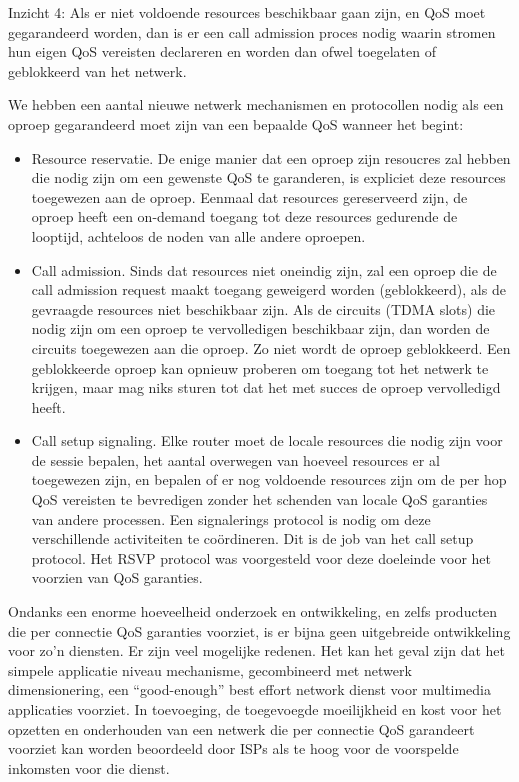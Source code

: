 \noindent Inzicht 4: Als er niet voldoende resources beschikbaar gaan zijn, en QoS moet gegarandeerd worden, dan is er een call admission proces nodig waarin stromen hun eigen QoS vereisten declareren en worden dan ofwel toegelaten of geblokkeerd van het netwerk.

\noindent We hebben een aantal nieuwe netwerk mechanismen en protocollen nodig als een oproep gegarandeerd moet zijn van een bepaalde QoS wanneer het begint:

\begin{itemize}
\item Resource reservatie. De enige manier dat een oproep zijn resoucres zal hebben die nodig zijn om een gewenste QoS te garanderen, is expliciet deze resources toegewezen aan de oproep. Eenmaal dat resources gereserveerd zijn, de oproep heeft een on-demand toegang tot deze resources gedurende de looptijd, achteloos de noden van alle andere oproepen.
\item Call admission. Sinds dat resources niet oneindig zijn, zal een oproep die de call admission request maakt toegang geweigerd worden (geblokkeerd), als de gevraagde resources niet beschikbaar zijn. Als de circuits (TDMA slots) die nodig zijn om een oproep te vervolledigen beschikbaar zijn, dan worden de circuits toegewezen aan die oproep. Zo niet wordt de oproep geblokkeerd. Een geblokkeerde oproep kan opnieuw proberen om toegang tot het netwerk te krijgen, maar mag niks sturen tot dat het met succes de oproep vervolledigd heeft.
\item Call setup signaling. Elke router moet de locale resources die nodig zijn voor de sessie bepalen, het aantal overwegen van hoeveel resources er al toegewezen zijn, en bepalen of er nog voldoende resources zijn om de per hop QoS vereisten te bevredigen zonder het schenden van locale QoS garanties van andere processen. Een signalerings protocol is nodig om deze verschillende activiteiten te coördineren. Dit is de job van het call setup protocol. Het RSVP protocol was voorgesteld voor deze doeleinde voor het voorzien van QoS garanties.
\end{itemize}

\noindent Ondanks een enorme hoeveelheid onderzoek en ontwikkeling, en zelfs producten die per connectie QoS garanties voorziet, is er bijna geen uitgebreide ontwikkeling voor zo’n diensten. Er zijn veel mogelijke redenen. Het kan het geval zijn dat het simpele applicatie niveau mechanisme, gecombineerd met netwerk dimensionering, een “good-enough” best effort network dienst voor multimedia applicaties voorziet. In toevoeging, de toegevoegde moeilijkheid en kost voor het opzetten en onderhouden van een netwerk die per connectie QoS garandeert voorziet kan worden beoordeeld door ISPs als te hoog voor de voorspelde inkomsten voor die dienst. 
